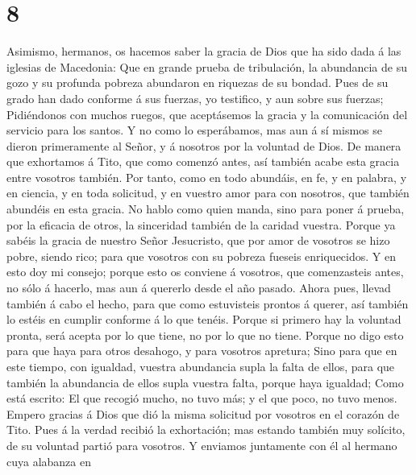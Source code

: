\hypertarget{section-7}{%
\section{8}\label{section-7}}

 Asimismo, hermanos, os hacemos saber la gracia de Dios
que ha sido dada á las iglesias de Macedonia:  Que en
grande prueba de tribulación, la abundancia de su gozo y su profunda
pobreza abundaron en riquezas de su bondad.  Pues de su
grado han dado conforme á sus fuerzas, yo testifico, y aun sobre sus
fuerzas;  Pidiéndonos con muchos ruegos, que aceptásemos
la gracia y la comunicación del servicio para los santos. 
Y no como lo esperábamos, mas aun á sí mismos se dieron primeramente al
Señor, y á nosotros por la voluntad de Dios.  De manera
que exhortamos á Tito, que como comenzó antes, así también acabe esta
gracia entre vosotros también.  Por tanto, como en todo
abundáis, en fe, y en palabra, y en ciencia, y en toda solicitud, y en
vuestro amor para con nosotros, que también abundéis en esta gracia.
 No hablo como quien manda, sino para poner á prueba, por
la eficacia de otros, la sinceridad también de la caridad vuestra.
 Porque ya sabéis la gracia de nuestro Señor Jesucristo,
que por amor de vosotros se hizo pobre, siendo rico; para que vosotros
con su pobreza fueseis enriquecidos.  Y en esto doy mi
consejo; porque esto os conviene á vosotros, que comenzasteis antes, no
sólo á hacerlo, mas aun á quererlo desde el año pasado. 
Ahora pues, llevad también á cabo el hecho, para que como estuvisteis
prontos á querer, así también lo estéis en cumplir conforme á lo que
tenéis.  Porque si primero hay la voluntad pronta, será
acepta por lo que tiene, no por lo que no tiene.  Porque
no digo esto para que haya para otros desahogo, y para vosotros
apretura;  Sino para que en este tiempo, con igualdad,
vuestra abundancia supla la falta de ellos, para que también la
abundancia de ellos supla vuestra falta, porque haya igualdad;
 Como está escrito: El que recogió mucho, no tuvo más; y
el que poco, no tuvo menos.  Empero gracias á Dios que
dió la misma solicitud por vosotros en el corazón de Tito.
 Pues á la verdad recibió la exhortación; mas estando
también muy solícito, de su voluntad partió para vosotros.
 Y enviamos juntamente con él al hermano cuya alabanza en
